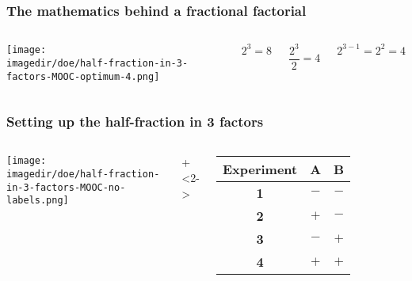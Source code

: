 \begin{frame}\frametitle{The mathematics behind a fractional factorial}
	\begin{columns}
			\begin{center}
				\texttt{[image: \\imagedir/doe/half-fraction-in-3-factors-MOOC-optimum-4.png]}
			\end{center}
			
			{\fontsize{1cm}{2em}\selectfont  $2^3 = 8$}
	
			\pause
			\vspace{1cm}
			{\fontsize{1cm}{2em}\selectfont  $\dfrac{2^3}{2} = 4$}
	
			\pause
			\vspace{1cm}
			{\fontsize{1cm}{2em}\selectfont  $2^{3-1} = 2^2 = 4$}
	\end{columns}	

\end{frame}

\begin{frame}\frametitle{Setting up the half-fraction in 3 factors}
	\begin{columns}
		\column{0.65\textwidth}
			\begin{center}
				\texttt{[image: \\imagedir/doe/half-fraction-in-3-factors-MOOC-no-labels.png]}
			\end{center}
			
		\onslide+<2->	{
		\column{0.55\textwidth}
			\begin{tabulary}{\linewidth}{|c||c|c|}\hline 
				\textsf{\relax Experiment } & \textbf{\relax A } & \textbf{\relax B } \\ %
				\hline \textbf{1} & \(-\) & \(-\) \\%
				\hline \textbf{2} & \(+\) & \(-\) \\%
				\hline \textbf{3} & \(-\) & \(+\) \\%
				\hline \textbf{4} & \(+\) & \(+\) \\%
				\hline
			\end{tabulary}
		}
	\end{columns}	
\end{frame}

